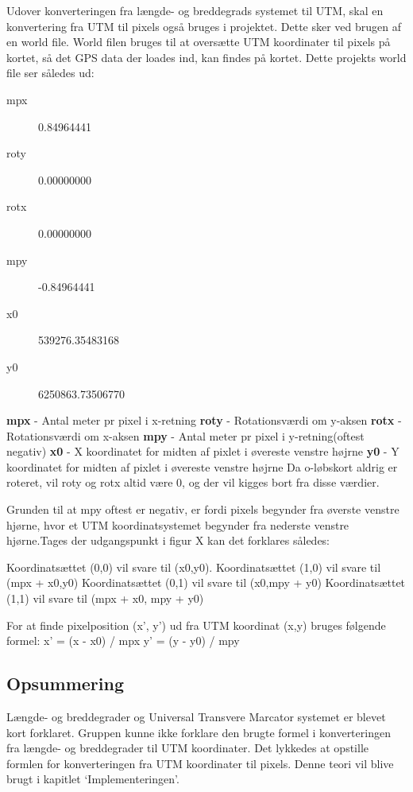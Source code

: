 Udover konverteringen fra længde- og breddegrads systemet til UTM, skal en konvertering fra UTM til pixels også bruges i projektet. Dette sker ved brugen af en world file. World filen bruges til at oversætte UTM koordinater til pixels på kortet, så det GPS data der loades ind, kan findes på kortet. Dette projekts world file ser således ud:
\begin{description}
\item[mpx] 0.84964441
\item[roty] 0.00000000
\item[rotx] 0.00000000
\item[mpy] -0.84964441
\item[x0] 539276.35483168
\item[y0] 6250863.73506770
\end{description}
\textbf{mpx} - Antal meter pr pixel i x-retning\newline
\textbf{roty} - Rotationsværdi om y-aksen\newline
\textbf{rotx} - Rotationsværdi om x-aksen\newline
\textbf{mpy} - Antal meter pr pixel i y-retning(oftest negativ)\newline
\textbf{x0} - X koordinatet for midten af pixlet i øvereste venstre højrne\newline
\textbf{y0} - Y koordinatet for midten af pixlet i øvereste venstre højrne\newline
Da o-løbskort aldrig er roteret, vil roty og rotx altid være 0, og der vil kigges bort fra disse værdier.

Grunden til at mpy oftest er negativ, er fordi pixels begynder fra øverste venstre hjørne, hvor et UTM koordinatsystemet begynder fra nederste venstre hjørne.Tages der udgangspunkt i figur X kan det forklares således:

Koordinatsættet (0,0) vil svare til (x0,y0).
Koordinatsættet (1,0) vil svare til (mpx + x0,y0)
Koordinatsættet (0,1) vil svare til (x0,mpy + y0)
Koordinatsættet (1,1) vil svare til (mpx + x0, mpy + y0)

For at finde pixelposition (x’, y’) ud fra UTM koordinat (x,y) bruges følgende formel:\newline
x’ = (x - x0) / mpx\newline
y’ = (y - y0) / mpy\newline

\subsection{Opsummering}
Længde- og breddegrader og Universal Transvere Marcator systemet er blevet kort forklaret. Gruppen kunne ikke forklare den brugte formel i konverteringen fra længde- og breddegrader til UTM koordinater. Det lykkedes at opstille formlen for konverteringen fra UTM koordinater til pixels. Denne teori vil blive brugt i kapitlet ‘Implementeringen’. 